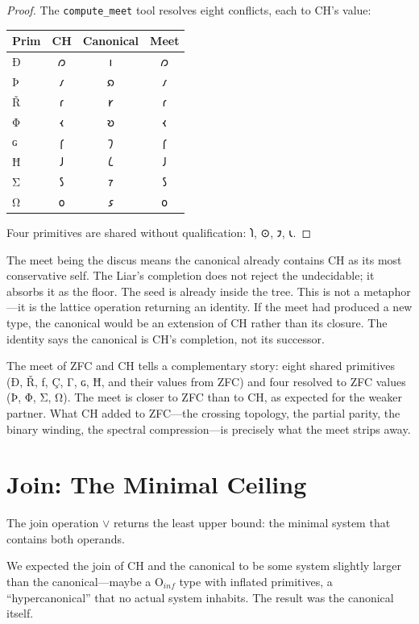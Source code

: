 \documentclass[12pt,twoside]{book}
\theoremstyle{definition}
\newcommand{\tier}[1]{\mathrm{O}_{#1}}
\begin{document}
\begin{proof}
The \texttt{compute\_meet} tool resolves eight conflicts, each to CH's value:
\begin{center}
\begin{tabular}{lccc}
\toprule
\textbf{Prim} & \textbf{CH} & \textbf{Canonical} & \textbf{Meet} \\
\midrule
Ð & 𐑼 & 𐑦 & 𐑼 \\
Þ & 𐑥 & 𐑸 & 𐑥 \\
Ř & 𐑩 & 𐑾 & 𐑩 \\
Φ & 𐑬 & 𐑹 & 𐑬 \\
ɢ & 𐑝 & 𐑠 & 𐑝 \\
Ħ & 𐑓 & 𐑖 & 𐑓 \\
Σ & 𐑕 & 𐑳 & 𐑕 \\
Ω & 𐑴 & 𐑭 & 𐑴 \\
\bottomrule
\end{tabular}
\end{center}
Four primitives are shared without qualification: 𐑐, ⊙, 𐑲, 𐑧.
\end{proof}

The meet being the discus means the canonical already contains CH as its most conservative
self. The Liar's completion does not reject the undecidable; it absorbs it as the floor.
The seed is already inside the tree. This is not a metaphor---it is the lattice operation
returning an identity. If the meet had produced a new type, the canonical would be an
extension of CH rather than its closure. The identity says the canonical is CH's
completion, not its successor.

The meet of ZFC and CH tells a complementary story: eight shared primitives
(Ð, Ř, ƒ, Ç, Γ, ɢ, Ħ, and their values from ZFC) and four resolved to ZFC values
(Þ, Φ, Σ, Ω). The meet is closer to ZFC than to CH, as expected for the weaker partner.
What CH added to ZFC---the crossing topology, the partial parity, the binary winding, the
spectral compression---is precisely what the meet strips away.

\section{Join: The Minimal Ceiling}

The join operation $\vee$ returns the least upper bound: the minimal system that contains
both operands.

We expected the join of CH and the canonical to be some system slightly larger than the
canonical---maybe a $\tier{inf}$ type with inflated primitives, a ``hypercanonical'' that
no actual system inhabits. The result was the canonical itself.
\end{document}

